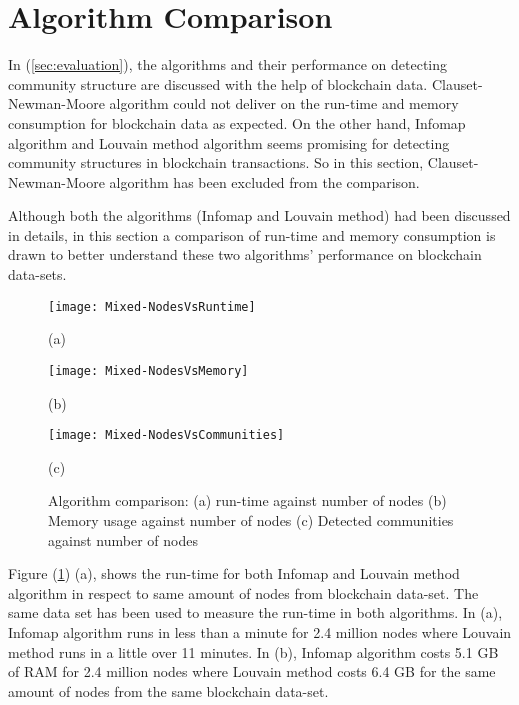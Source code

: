 \vfill
\pagebreak

\section{Algorithm Comparison}
In (\ref{sec:evaluation}), the algorithms and their performance on detecting community structure are discussed with the help of blockchain data. Clauset-Newman-Moore algorithm could not deliver on the run-time and memory consumption for blockchain data as expected. On the other hand, Infomap algorithm and Louvain method algorithm seems promising for detecting community structures in blockchain transactions. So in this section, Clauset-Newman-Moore algorithm has been excluded from the comparison.

Although both the algorithms (Infomap and Louvain method) had been discussed in details, in this section a comparison of run-time and memory consumption is drawn to better understand these two algorithms' performance on blockchain data-sets.

\begin{figure}[H]
  \centering
  \begin{minipage}[b]{0.4\textwidth}
    \texttt{[image: Mixed-NodesVsRuntime]}
    \caption*{(a)}
  \end{minipage}
  \begin{minipage}[b]{0.4\textwidth}
    \texttt{[image: Mixed-NodesVsMemory]}
    \caption*{(b)}
  \end{minipage}
  \begin{minipage}[b]{0.4\textwidth}
    \texttt{[image: Mixed-NodesVsCommunities]}
    \caption*{(c)}
  \end{minipage}
  \caption{Algorithm comparison: (a) run-time against number of nodes (b) Memory usage against number of nodes (c) Detected communities against number of nodes}
  \label{fig:algo-run-comparision}
\end{figure}

Figure (\ref{fig:algo-run-comparision}) (a), shows the run-time for both Infomap and Louvain method algorithm in respect to same amount of nodes from blockchain data-set. The same data set has been used to measure the run-time in both algorithms. In (a), Infomap algorithm runs in less than a minute for 2.4 million nodes where Louvain method runs in a little over 11 minutes. In (b), Infomap algorithm costs 5.1 GB of RAM for 2.4 million nodes where Louvain method costs 6.4 GB for the same amount of nodes from the same blockchain data-set.

